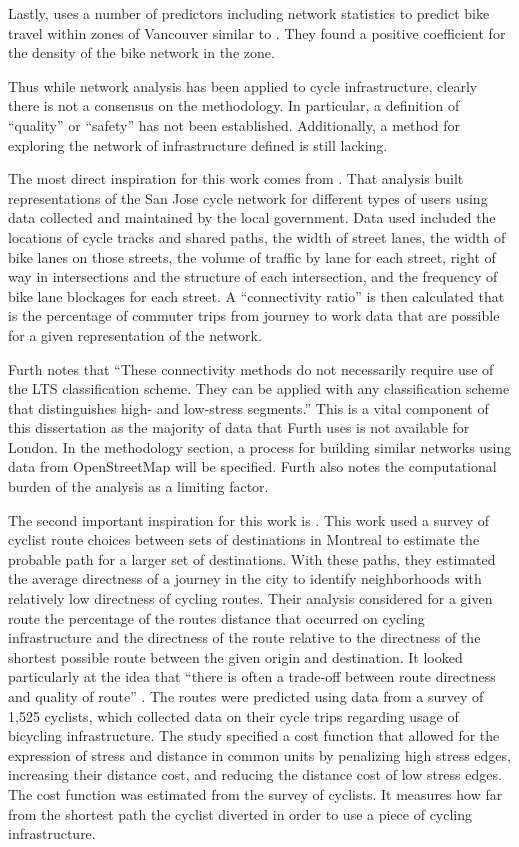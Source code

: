 Lastly, \textcite{osama2017models} uses a number of predictors including network statistics to predict bike travel within zones of Vancouver similar to \textcite{schoner2014missing}. They found a positive coefficient for the density of the bike network in the zone. 

Thus while network analysis has been applied to cycle infrastructure, clearly there is not a consensus on the methodology. In particular, a definition of ``quality'' or ``safety'' has not been established. Additionally, a method for exploring the network of infrastructure defined is still lacking. 

The most direct inspiration for this work comes from \textcite{furth2016network}. That analysis built representations of the San Jose cycle network for different types of users using data collected and maintained by the local government. Data used included the locations of cycle tracks and shared paths, the width of street lanes, the width of bike lanes on those streets,  the volume of traffic by lane for each street, right of way in intersections and the structure of each intersection, and the frequency of bike lane blockages for each street. A ``connectivity ratio'' is then calculated that is the percentage of commuter trips from journey to work data that are possible for a given representation of the network. 

Furth notes that ``These connectivity methods do not necessarily require use of the LTS classification scheme. They can be applied with any classification scheme that distinguishes high- and low-stress segments.'' This is a vital component of this dissertation as the majority of data that Furth uses is not available for London. In the methodology section, a process for building similar networks using data from OpenStreetMap will be specified. Furth also notes the computational burden of the analysis as a limiting factor. 

The second important inspiration for this work is \textcite{boisjoly2019bicycle}. This work used a survey of cyclist route choices between sets of destinations in Montreal to estimate the probable path for a larger set of destinations. With these paths, they estimated the average directness of a journey in the city to identify neighborhoods with relatively low directness of cycling routes.  Their analysis considered for a given route the percentage of the routes distance that occurred on cycling infrastructure and the directness of the route relative to the directness of the shortest possible route between the given origin and destination. It looked particularly at the idea that ``there is often a trade-off between route directness and quality of route'' \parencite{boisjoly2019bicycle}.  The routes were predicted using data from a survey of 1,525 cyclists, which collected data on their cycle trips regarding usage of bicycling infrastructure. The study specified a cost function that allowed for the expression of stress and distance in common units by penalizing high stress edges, increasing their distance cost, and reducing the distance cost of low stress edges. The cost function was estimated from the survey of cyclists. It measures how far from the shortest path the cyclist diverted in order to use a piece of cycling infrastructure. 

